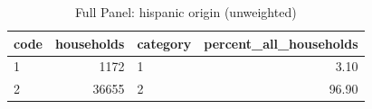 \begin{table}
\caption{Full Panel: hispanic origin (unweighted)}
\begin{tabular}{lrlr}
\toprule
code & households & category & percent\_all\_households \\
\midrule
1 & 1172 & 1 & 3.10 \\
2 & 36655 & 2 & 96.90 \\
\bottomrule
\end{tabular}
\end{table}

